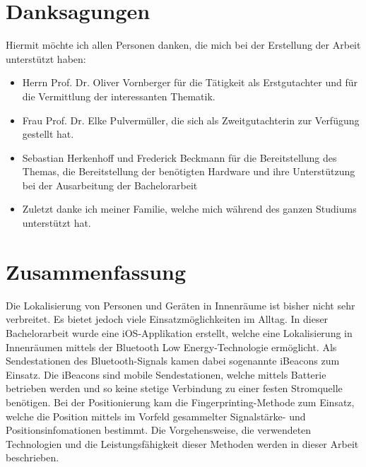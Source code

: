 \documentclass{AGTI}
\begin{document}
\standardTitelblatt
\cleardoublepage


\thispagestyle{empty}
\section*{Danksagungen}


Hiermit möchte ich allen Personen danken, die mich bei der Erstellung der Arbeit
unterstützt haben:

\begin{itemize}
  \item Herrn Prof. Dr. Oliver Vornberger für die Tätigkeit als Erstgutachter und für die Vermittlung
    der interessanten Thematik.
  \item Frau Prof. Dr. Elke Pulvermüller, die sich als Zweitgutachterin zur Verfügung gestellt hat.
  \item Sebastian Herkenhoff und Frederick Beckmann für die Bereitstellung des Themas, die Bereitstellung der benötigten Hardware und ihre Unterstützung bei der Ausarbeitung der Bachelorarbeit
  \item Zuletzt danke ich meiner Familie, welche mich während des ganzen Studiums unterstützt hat.
  
\end{itemize}

\cleardoublepage

\thispagestyle{empty}



\section*{Zusammenfassung}

Die Lokalisierung von Personen und Geräten in Innenräume ist bisher nicht sehr verbreitet. Es bietet jedoch viele Einsatzmöglichkeiten im Alltag. In dieser Bachelorarbeit wurde eine iOS-Applikation erstellt, welche eine Lokalisierung in Innenräumen mittels der Bluetooth Low Energy-Technologie ermöglicht. Als Sendestationen des Bluetooth-Signals kamen dabei sogenannte iBeacons zum Einsatz. Die iBeacons sind mobile Sendestationen, welche mittels Batterie betrieben werden und so keine stetige Verbindung zu einer festen Stromquelle benötigen.
Bei der Positionierung kam die Fingerprinting-Methode zum Einsatz, welche die Position mittels im Vorfeld gesammelter Signalstärke- und Positionsinfomationen bestimmt. Die Vorgehensweise, die verwendeten Technologien und die Leistungsfähigkeit dieser Methoden werden in dieser Arbeit beschrieben.
\end{document}
